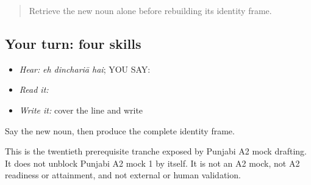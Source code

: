 \label{lesson:PA-C197-payoff}



\begin{quote}
Retrieve the new noun alone before rebuilding its identity frame.
\end{quote}

\subsection*{Your turn: four skills}
\begin{itemize}
\raggedright
  \item \emph{Hear:} \emph{eh dinchariā hai}; YOU SAY: \textbf{  }
  \item \emph{Read it:} \textbf{  }
  \item \emph{Write it:} cover the line and write \textbf{  }
\end{itemize}

\begin{tcolorbox}[breakable,colback=teal!4,colframe=teal!35!black,title={Before you move on}]
Say the new noun, then produce the complete identity frame.

This is the twentieth prerequisite tranche exposed by Punjabi A2 mock drafting. It does not unblock Punjabi A2 mock 1 by itself. It is not an A2 mock, not A2 readiness or attainment, and not external or human validation.
\end{tcolorbox}
